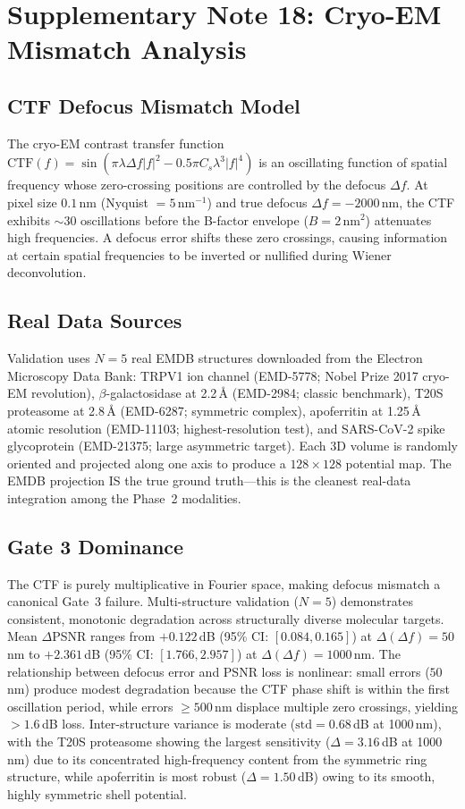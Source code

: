 \documentclass[11pt]{article}
\theoremstyle{definition}
\begin{document}
\section{Supplementary Note 18: Cryo-EM Mismatch Analysis}
\label{sec:note_cryoem}

\subsection{CTF Defocus Mismatch Model}
The cryo-EM contrast transfer function $\mathrm{CTF}(f) = \sin(\pi \lambda \Delta f |f|^2 - 0.5\pi C_s \lambda^3 |f|^4)$ is an oscillating function of spatial frequency whose zero-crossing positions are controlled by the defocus $\Delta f$. At pixel size $0.1$\,nm (Nyquist $= 5$\,nm$^{-1}$) and true defocus $\Delta f = -2000$\,nm, the CTF exhibits ${\sim}30$ oscillations before the B-factor envelope ($B = 2$\,nm$^2$) attenuates high frequencies. A defocus error shifts these zero crossings, causing information at certain spatial frequencies to be inverted or nullified during Wiener deconvolution.

\subsection{Real Data Sources}
Validation uses $N{=}5$ real EMDB structures downloaded from the Electron Microscopy Data Bank: TRPV1 ion channel (EMD-5778; Nobel Prize 2017 cryo-EM revolution), $\beta$-galactosidase at 2.2\,\AA{} (EMD-2984; classic benchmark), T20S proteasome at 2.8\,\AA{} (EMD-6287; symmetric complex), apoferritin at 1.25\,\AA{} atomic resolution (EMD-11103; highest-resolution test), and SARS-CoV-2 spike glycoprotein (EMD-21375; large asymmetric target). Each 3D volume is randomly oriented and projected along one axis to produce a $128 \times 128$ potential map. The EMDB projection IS the true ground truth---this is the cleanest real-data integration among the Phase~2 modalities.

\subsection{Gate 3 Dominance}
The CTF is purely multiplicative in Fourier space, making defocus mismatch a canonical Gate~3 failure. Multi-structure validation ($N{=}5$) demonstrates consistent, monotonic degradation across structurally diverse molecular targets. Mean $\Delta$PSNR ranges from $+0.122$\,dB (95\% CI: $[0.084, 0.165]$) at $\Delta(\Delta f){=}50$\,nm to $+2.361$\,dB (95\% CI: $[1.766, 2.957]$) at $\Delta(\Delta f){=}1000$\,nm.
The relationship between defocus error and PSNR loss is nonlinear: small errors ($50$\,nm) produce modest degradation because the CTF phase shift is within the first oscillation period, while errors $\geq 500$\,nm displace multiple zero crossings, yielding $>1.6$\,dB loss.
Inter-structure variance is moderate ($\mathrm{std} = 0.68$\,dB at 1000\,nm), with the T20S proteasome showing the largest sensitivity ($\Delta{=}3.16$\,dB at 1000\,nm) due to its concentrated high-frequency content from the symmetric ring structure, while apoferritin is most robust ($\Delta{=}1.50$\,dB) owing to its smooth, highly symmetric shell potential.
\end{document}
